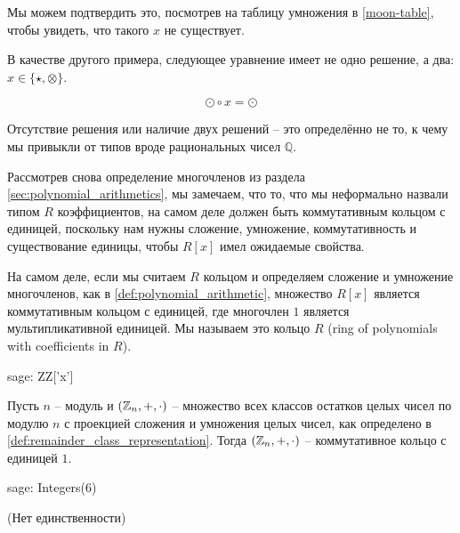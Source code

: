 \begin{example}
Мы можем подтвердить это, посмотрев на таблицу умножения в \eqref{moon-table}, чтобы увидеть, что такого $x$ не существует.

В качестве другого примера, следующее уравнение имеет не одно решение, а два: $x\in\{\star, \otimes\}$.

\begin{equation}
\odot \circ x = \odot
\end{equation}

Отсутствие решения или наличие двух решений -- это определённо не то, к чему мы привыкли от типов вроде рациональных чисел $\mathbb{Q}$.
\end{example}

\begin{example} Рассмотрев снова определение многочленов из раздела \ref{sec:polynomial_arithmetics}, мы замечаем, что то, что мы неформально назвали типом $R$ коэффициентов, на самом деле должен быть коммутативным кольцом с единицей, поскольку нам нужны сложение, умножение, коммутативность и существование единицы, чтобы $R[x]$ имел ожидаемые свойства.

На самом деле, если мы считаем $R$ кольцом и определяем сложение и умножение многочленов, как в \eqref{def:polynomial_arithmetic}, множество $R[x]$ является коммутативным кольцом с единицей, где многочлен $1$ является мультипликативной единицей. Мы называем это кольцо  $R$ (ring of polynomials with coefficients in $R$).
\begin{sagecommandline}
sage: ZZ['x']
\end{sagecommandline}
\end{example}
\begin{example}
\label{def:ring_of_mod_n_arithmetics}
 Пусть $n$ -- модуль и $(\mathbb{Z}_n,+,\cdot)$ -- множество всех классов остатков целых чисел по модулю $n$ с проекцией сложения и умножения целых чисел, как определено в \secname \ref{def:remainder_class_representation}. Тогда $(\mathbb{Z}_n,+,\cdot)$ -- коммутативное кольцо с единицей $1$.
\begin{sagecommandline}
sage: Integers(6)
\end{sagecommandline}
\end{example}
\begin{example}
 (Нет единственности)
\end{example}


